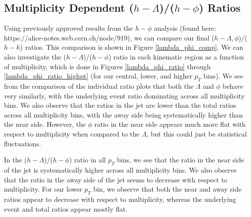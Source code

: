 \documentclass[ALICE,manyauthors]{ALICE_analysis_notes}
\begin{document}
\clearpage

\subsection{Multiplicity Dependent ($h-\Lambda$)/($h-\phi$) Ratios}
Using previously approved results from the $h-\phi$ analysis (found here: https://alice-notes.web.cern.ch/node/919), we can compare our final ($h-\Lambda, \phi$)/($h-h$) ratios. This comparison is shown in Figure \ref{lambda_phi_comp}. We can also investigate the ($h-\Lambda$)/($h-\phi$) ratio in each kinematic region as a function of multiplicity, which is done in Figures \ref{lambda_phi_ratio} through \ref{lambda_phi_ratio_highpt} (for our central, lower, and higher $p_{T}$ bins). We see from the comparison of the individual ratio plots that both the $\Lambda$ and $\phi$ behave very similarly, with the underlying event ratio dominating across all multiplicity bins. We also observe that the ratios in the jet are lower than the total ratios across all multiplicity bins, with the away side being systematically higher than the near side. However, the $\phi$ ratio in the near side appears much more flat with respect to multiplicity when compared to the $\Lambda$, but this could just be statistical fluctuations.

In the ($h-\Lambda$)/($h-\phi$) ratio in all $p_{T}$ bins, we see that the ratio in the near side of the jet is systematically higher across all multiplicity bins. We also observe that the ratio in the away side of the jet seems to decrease with respect to multiplicity. For our lower $p_{T}$ bin, we observe that both the near and away side ratios appear to decrease with respect to multiplicity, whereas the underlying event and total ratios appear mostly flat.
\end{document}
